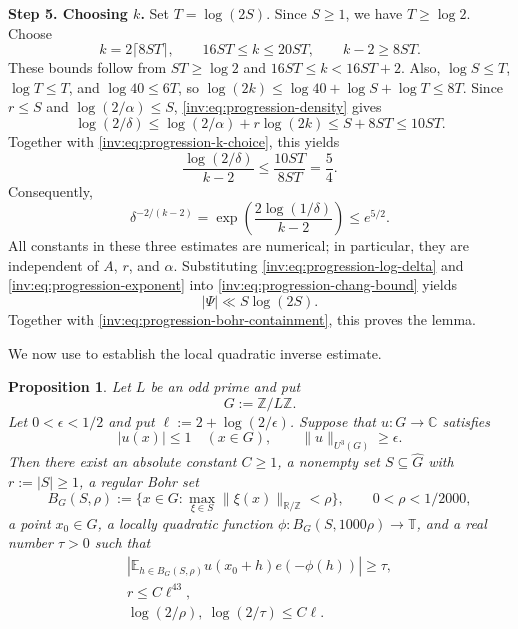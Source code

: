 \documentclass[twoside]{aomart}
\makeatletter
\theoremstyle{paperplain}
\newtheorem{proposition}[theorem]{Proposition}
\theoremstyle{paperdefinition}
\renewenvironment{proof}[1][\proofname]{\par\pushQED{\qed}%
  \normalfont\topsep6\p@\@plus3\p@\relax\trivlist
  \item[\hskip\labelsep\itshape #1\@addpunct{.}]\ignorespaces
}{\popQED\endtrivlist\@endpefalse}
\numberwithin{equation}{section}
\makeatother
\begin{document}
\begin{proof}
\par
\medskip
\noindent\textbf{Step 5. Choosing $k$.}
Set $T=\log(2S)$. Since $S\ge1$, we have $T\ge\log2$.
Choose
\begin{equation}
 k=2\lceil8ST\rceil,\qquad
 16ST\le k\le20ST,\qquad k-2\ge8ST.
 \label{inv:eq:progression-k-choice}
\end{equation}
These bounds follow from $ST\ge\log2$ and
$16ST\le k<16ST+2$. Also,
$\log S\le T$, $\log T\le T$, and $\log40\le6T$, so
$\log(2k)\le\log40+\log S+\log T\le8T$.
Since $r\le S$ and $\log(2/\alpha)\le S$,
\eqref{inv:eq:progression-density} gives
\begin{equation}
 \log(2/\delta)
 \le\log(2/\alpha)+r\log(2k)
 \le S+8ST\le10ST.
 \label{inv:eq:progression-log-delta}
\end{equation}
Together with \eqref{inv:eq:progression-k-choice}, this yields
\begin{equation*}
 \frac{\log(2/\delta)}{k-2}\le\frac{10ST}{8ST}=\frac54.
\end{equation*}
Consequently,
\begin{equation}
 \delta^{-2/(k-2)}
 =\exp\!\left(\frac{2\log(1/\delta)}{k-2}\right)
 \le e^{5/2}.
 \label{inv:eq:progression-exponent}
\end{equation}
All constants in these three estimates are numerical; in particular,
they are independent of $A$, $r$, and $\alpha$.
Substituting \eqref{inv:eq:progression-log-delta} and
\eqref{inv:eq:progression-exponent} into
\eqref{inv:eq:progression-chang-bound} yields
\begin{equation*}
 |\Psi|\ll S\log(2S).
\end{equation*}
Together with \eqref{inv:eq:progression-bohr-containment}, this proves
the lemma.
\end{proof}

We now use  to establish the local
quadratic inverse estimate.

\begin{proposition}
\label{inv:bohr-rank}
Let $L$ be an odd prime and put
\[
 G:=\mathbb Z/L\mathbb Z.
\]
Let $0<\epsilon<1/2$ and put
$\ell:=2+\log(2/\epsilon)$. Suppose that $u:G\to\mathbb C$ satisfies
\[
 |u(x)|\le1\quad(x\in G),
 \qquad
 \|u\|_{U^3(G)}\ge\epsilon.
\]
Then there exist an absolute constant $C\ge1$, a nonempty set
$S\subseteq\widehat G$ with $r:=|S|\ge1$, a regular Bohr set
\[
 B_G(S,\rho):=
 \{x\in G:\max_{\xi\in S}\|\xi(x)\|_{\mathbb R/\mathbb Z}<\rho\},
 \qquad 0<\rho<1/2000,
\]
a point $x_0\in G$, a locally quadratic function
$\phi:B_G(S,1000\rho)\to\mathbb T$, and a real number $\tau>0$
such that
\begin{gather*}
 \left|\mathbb E_{h\in B_G(S,\rho)}
             u(x_0+h)e(-\phi(h))\right|\ge\tau,
 \\
 r\le C\ell^{43},
 \\
 \log(2/\rho),\ \log(2/\tau)\le C\ell.
\end{gather*}
\end{proposition}
\end{document}
